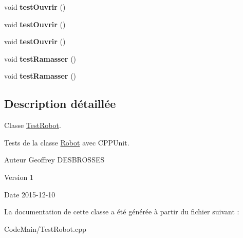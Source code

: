 \begin{DoxyCompactItemize}
\item 
\hypertarget{classTestRobot_a6d976a0403c5d0ad6ed217dc81fc52d9}{}void {\bfseries test\+Ouvrir} ()\label{classTestRobot_a6d976a0403c5d0ad6ed217dc81fc52d9}

\item 
\hypertarget{classTestRobot_a6d976a0403c5d0ad6ed217dc81fc52d9}{}void {\bfseries test\+Ouvrir} ()\label{classTestRobot_a6d976a0403c5d0ad6ed217dc81fc52d9}

\item 
\hypertarget{classTestRobot_a6d976a0403c5d0ad6ed217dc81fc52d9}{}void {\bfseries test\+Ouvrir} ()\label{classTestRobot_a6d976a0403c5d0ad6ed217dc81fc52d9}

\item 
\hypertarget{classTestRobot_a4bec25d19fc469f44c17e179f8f4ef7f}{}void {\bfseries test\+Ramasser} ()\label{classTestRobot_a4bec25d19fc469f44c17e179f8f4ef7f}

\item 
\hypertarget{classTestRobot_a4bec25d19fc469f44c17e179f8f4ef7f}{}void {\bfseries test\+Ramasser} ()\label{classTestRobot_a4bec25d19fc469f44c17e179f8f4ef7f}

\end{DoxyCompactItemize}


\subsection{Description détaillée}
Classe \hyperlink{classTestRobot}{Test\+Robot}. 

Tests de la classe \hyperlink{classRobot}{Robot} avec C\+P\+P\+Unit. \begin{DoxyAuthor}{Auteur}
Geoffrey D\+E\+S\+B\+R\+O\+S\+S\+E\+S 
\end{DoxyAuthor}
\begin{DoxyVersion}{Version}
1 
\end{DoxyVersion}
\begin{DoxyDate}{Date}
2015-\/12-\/10 
\end{DoxyDate}


La documentation de cette classe a été générée à partir du fichier suivant \+:\begin{DoxyCompactItemize}
\item 
Code\+Main/Test\+Robot.\+cpp\end{DoxyCompactItemize}
